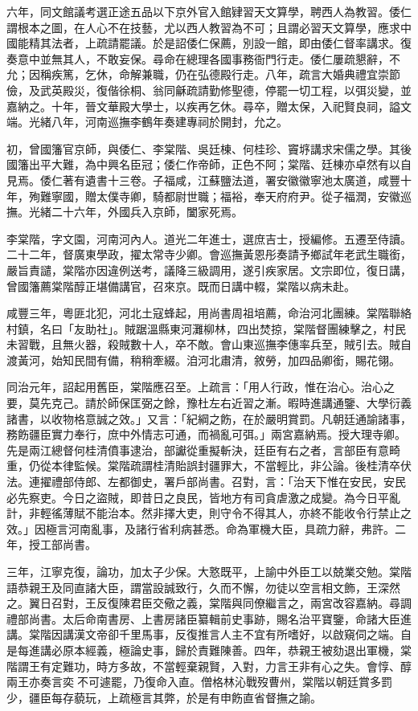 \begin{pinyinscope}
六年，同文館議考選正途五品以下京外官入館肄習天文算學，聘西人為教習。倭仁謂根本之圖，在人心不在技藝，尤以西人教習為不可；且謂必習天文算學，應求中國能精其法者，上疏請罷議。於是詔倭仁保薦，別設一館，即由倭仁督率講求。復奏意中並無其人，不敢妄保。尋命在總理各國事務衙門行走。倭仁屢疏懇辭，不允；因稱疾篤，乞休，命解兼職，仍在弘德殿行走。八年，疏言大婚典禮宜崇節儉，及武英殿災，復偕徐桐、翁同龢疏請勤修聖德，停罷一切工程，以弭災變，並嘉納之。十年，晉文華殿大學士，以疾再乞休。尋卒，贈太保，入祀賢良祠，謚文端。光緒八年，河南巡撫李鶴年奏建專祠於開封，允之。

初，曾國籓官京師，與倭仁、李棠階、吳廷棟、何桂珍、竇垿講求宋儒之學。其後國籓出平大難，為中興名臣冠；倭仁作帝師，正色不阿；棠階、廷棟亦卓然有以自見焉。倭仁著有遺書十三卷。子福咸，江蘇鹽法道，署安徽徽寧池太廣道，咸豐十年，殉難寧國，贈太僕寺卿，騎都尉世職；福裕，奉天府府尹。從子福潤，安徽巡撫。光緒二十六年，外國兵入京師，闔家死焉。

李棠階，字文園，河南河內人。道光二年進士，選庶吉士，授編修。五遷至侍讀。二十二年，督廣東學政，擢太常寺少卿。會巡撫黃恩彤奏請予鄉試年老武生職銜，嚴旨責譴，棠階亦因違例送考，議降三級調用，遂引疾家居。文宗即位，復日講，曾國籓薦棠階醇正堪備講官，召來京。既而日講中輟，棠階以病未赴。

咸豐三年，粵匪北犯，河北土寇蜂起，用尚書周祖培薦，命治河北團練。棠階聯絡村鎮，名曰「友助社」。賊踞溫縣東河灘柳林，四出焚掠，棠階督團練擊之，村民未習戰，且無火器，殺賊數十人，卒不敵。會山東巡撫李僡率兵至，賊引去。賊自渡黃河，始知民間有備，稍稍牽綴。洎河北肅清，敘勞，加四品卿銜，賜花翎。

同治元年，詔起用舊臣，棠階應召至。上疏言：「用人行政，惟在治心。治心之要，莫先克己。請於師保匡弼之餘，豫杜左右近習之漸。暇時進講通鑒、大學衍義諸書，以收物格意誠之效。」又言：「紀綱之飭，在於嚴明賞罰。凡朝廷通諭諸事，務飭疆臣實力奉行，庶中外情志可通，而禍亂可弭。」兩宮嘉納焉。授大理寺卿。先是兩江總督何桂清僨事逮治，部讞從重擬斬決，廷臣有右之者，言部臣有意畸重，仍從本律監候。棠階疏謂桂清貽誤封疆罪大，不當輕比，非公論。後桂清卒伏法。連擢禮部侍郎、左都御史，署戶部尚書。召對，言：「治天下惟在安民，安民必先察吏。今日之盜賊，即昔日之良民，皆地方有司貪虐激之成變。為今日平亂計，非輕徭薄賦不能治本。然非擇大吏，則守令不得其人，亦終不能收令行禁止之效。」因極言河南亂事，及諸行省利病甚悉。命為軍機大臣，具疏力辭，弗許。二年，授工部尚書。

三年，江寧克復，論功，加太子少保。大憝既平，上諭中外臣工以兢業交勉。棠階語恭親王及同直諸大臣，謂當設誠致行，久而不懈，勿徒以空言相文飾，王深然之。翼日召對，王反復陳君臣交儆之義，棠階與同僚繼言之，兩宮改容嘉納。尋調禮部尚書。太后命南書房、上書房諸臣纂輯前史事跡，賜名治平寶鑒，命諸大臣進講。棠階因講漢文帝卻千里馬事，反復推言人主不宜有所嗜好，以啟窺伺之端。自是每進講必原本經義，極論史事，歸於責難陳善。四年，恭親王被劾退出軍機，棠階謂王有定難功，時方多故，不當輕棄親賢，入對，力言王非有心之失。會惇、醇兩王亦奏言奕不可遽罷，乃復命入直。僧格林沁戰歿曹州，棠階以朝廷賞多罰少，疆臣每存藐玩，上疏極言其弊，於是有申飭直省督撫之諭。


\end{pinyinscope}
